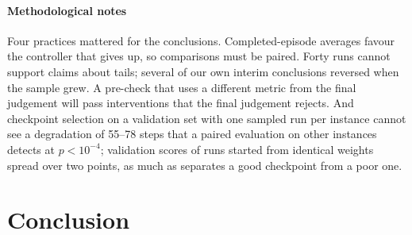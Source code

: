 \documentclass[final,5p,times,twocolumn]{elsarticle}
\begin{document}
\paragraph{Methodological notes}
Four practices mattered for the conclusions. Completed-episode averages favour the controller that
gives up, so comparisons must be paired. Forty runs cannot support claims about tails; several
of our own interim conclusions reversed when the sample grew. A pre-check that uses a different
metric from the final judgement will pass interventions that the final judgement rejects. And
checkpoint selection on a validation set with one sampled run per instance cannot see a
degradation of 55--78 steps that a paired evaluation on other instances detects at
$p < 10^{-4}$; validation scores of runs started from identical weights spread over two points,
as much as separates a good checkpoint from a poor one.

\section{Conclusion}
\label{sec:conclusion}
\end{document}
